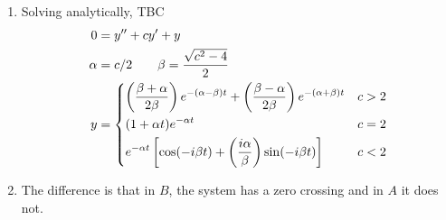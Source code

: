 \begin{enumerate}
\begin{enumerate}
              \item Solving analytically, TBC
                    \begin{align}
                        0      & = y'' + cy' + y                                 \\
                        \alpha & = c/2 \qquad \beta = \frac{\sqrt{c^{2} - 4}}{2} \\
                        y      & =
                        \begin{dcases}
                            \left( \frac{\beta + \alpha}{2\beta}
                            \right)e^{-(\alpha - \beta)t}
                            + \left( \frac{\beta - \alpha}{2\beta} \right)
                            e^{-(\alpha + \beta) t}     & c > 2 \\
                            (1 + \alpha t)e^{-\alpha t} & c = 2 \\
                            e^{-\alpha t}\left[\cos(-i\beta t)
                                + \left( \frac{i\alpha}{\beta} \right)
                            \sin(-i\beta t)\right]      & c < 2
                        \end{dcases}
                    \end{align}

              \item The difference is that in $B$, the system has a zero crossing and
                    in $A $ it does not.
          \end{enumerate}
\end{enumerate}